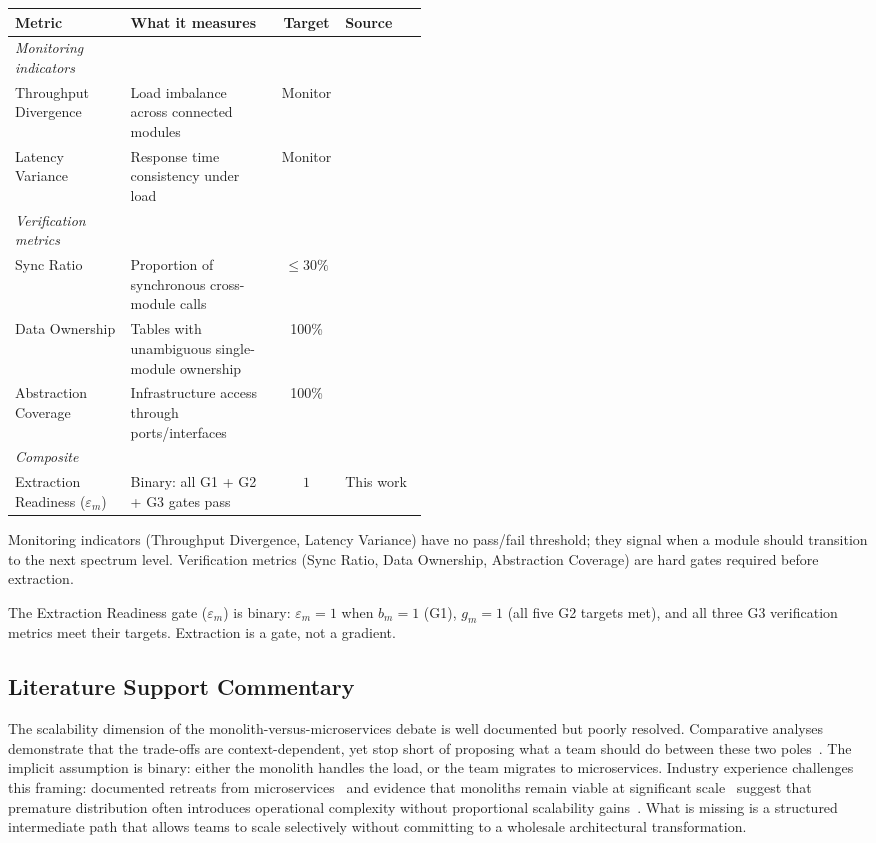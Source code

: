 \medskip
\noindent
\small
\begin{tabularx}{\linewidth}{p{0.28\linewidth} X c p{0.20\linewidth}}
\toprule
\textbf{Metric} & \textbf{What it measures} & \textbf{Target} & \textbf{Source} \\
\midrule
\emph{Monitoring indicators} & & & \\
Throughput Divergence & Load imbalance across connected modules & Monitor & \cite{richardson2018microservices} \\
Latency Variance & Response time consistency under load & Monitor & \cite{richardson2018microservices} \\
\midrule
\emph{Verification metrics} & & & \\
Sync Ratio & Proportion of synchronous cross-module calls & $\leq 30\%$ & \cite{dragoni2017microservices} \\
Data Ownership & Tables with unambiguous single-module ownership & 100\% & \cite{evans2003ddd} \\
Abstraction Coverage & Infrastructure access through ports/interfaces & 100\% & \cite{FordParsons2017} \\
\midrule
\emph{Composite} & & & \\
Extraction Readiness ($\varepsilon_m$) & Binary: all G1 + G2 + G3 gates pass & $1$ & This work \\
\bottomrule
\end{tabularx}
\normalsize

\medskip
\noindent
Monitoring indicators (Throughput Divergence, Latency Variance) have no pass/fail threshold; they signal when a module should transition to the next spectrum level. Verification metrics (Sync Ratio, Data Ownership, Abstraction Coverage) are hard gates required before extraction.

The Extraction Readiness gate ($\varepsilon_m$) is binary: $\varepsilon_m = 1$ when $b_m = 1$ (G1), $g_m = 1$ (all five G2 targets met), and all three G3 verification metrics meet their targets. Extraction is a gate, not a gradient.


\subsection*{Literature Support Commentary}

The scalability dimension of the monolith-versus-microservices debate is well documented but poorly resolved. Comparative analyses demonstrate that the trade-offs are context-dependent, yet stop short of proposing what a team should do between these two poles~\cite{jatkiewicz2023differences, berry2024isItWorth}. The implicit assumption is binary: either the monolith handles the load, or the team migrates to microservices. Industry experience challenges this framing: documented retreats from microservices~\cite{segment2023, auth02019} and evidence that monoliths remain viable at significant scale~\cite{medium2019} suggest that premature distribution often introduces operational complexity without proportional scalability gains~\cite{lima2024accelerating, gravanis2021dont, newman2019monolith}. What is missing is a structured intermediate path that allows teams to scale selectively without committing to a wholesale architectural transformation.

